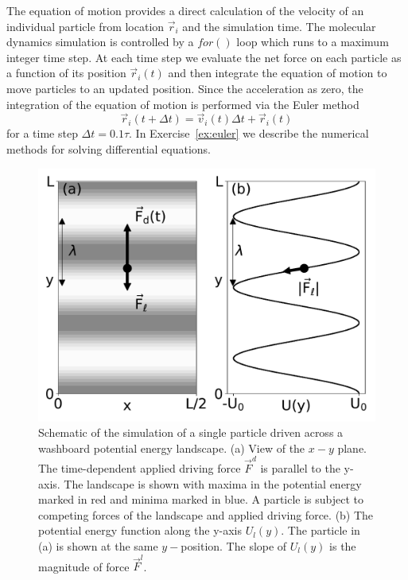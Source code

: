 \documentclass[twocolumn,showpacs,preprintnumbers,amsmath,amssymb,aps,prb]{revtex4}
\begin{document}
The equation of motion provides a direct calculation of the velocity
of an individual particle from location $\vec{r}_i$ 
and the simulation time.
The molecular dynamics simulation is controlled by a $for()$ loop
which runs to a maximum integer time step.
At each time step
we evaluate the net force on each particle as a function of its position
$\vec{r}_i(t)$
and then integrate
the equation of motion to move particles
to an updated position.
Since the acceleration as zero,
the integration of the equation of motion
is performed via 
the Euler method 
\begin{equation}
  \vec{r}_i(t+\Delta t) = \vec{v}_i(t) \Delta t + \vec{r}_i(t)
    \label{eq:euler}
\end{equation}
for a time step $\Delta t = 0.1 \tau$.
In 
Exercise~\ref{ex:euler}
we describe 
the numerical methods for 
solving differential equations.
\begin{figure} %
\centering
\includegraphics[width=\columnwidth]{fig1_landscape.pdf}
\caption{
  Schematic of the simulation of a single particle
  driven across a washboard potential energy landscape.
  (a) View of the $x-y$ plane. 
  The time-dependent applied driving force $\vec{F}^d$
  is parallel to the y-axis.
  The landscape is shown with 
  maxima in the potential energy marked in red
  and minima marked in blue.
  A particle is 
  subject to competing forces of the landscape and applied driving force.
  (b) The potential energy function
  along the y-axis $U_l(y)$.  
  The particle in (a) is shown at the same $y-$position.
  The slope of $U_l(y)$ is the 
  magnitude of force $\vec{F}^l$. 
  }
\label{fig:1_landscape}
\end{figure}
%
\end{document}
